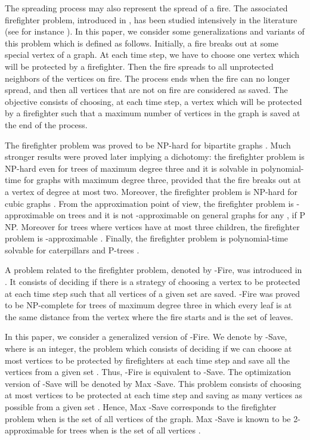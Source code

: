 \documentclass[10pt]{article}
\begin{document}
The spreading process may also represent the spread of a fire. The associated firefighter problem, introduced in \cite{hartnell1995}, 
has been studied intensively in the literature (see for instance \cite{anshelevich2009,cai2008,develin2007,finbow2007,finbow2009,hartnell1995,hartnell2000,IKM11,king2010,macgillivray2003,ng2008}). In this paper, 
we consider some generalizations and variants of this problem which is defined as follows.
Initially, a fire breaks out at some special
vertex  of a graph. At each time step, we have to choose one
vertex which will be protected by a firefighter. Then the fire
spreads to all unprotected neighbors of the vertices on fire. The
process ends when the fire can no longer spread, and then all
vertices that are not on fire are considered as saved. The
objective consists of choosing, at each time step, a vertex which
will be protected by a firefighter such that a maximum number of
vertices in the graph is saved at the end of the process. 

The firefighter problem
was proved to be NP-hard for bipartite graphs
\cite{macgillivray2003}. Much stronger results were proved later
\cite{finbow2007} implying a dichotomy: the firefighter problem is
NP-hard even for trees of maximum degree three and it is solvable
in polynomial-time for graphs with maximum degree three, provided
that the fire breaks out at a vertex of degree at most two.
Moreover, the firefighter problem is NP-hard for cubic graphs
\cite{king2010}. From the approximation point of view, the
firefighter problem is -approximable on trees \cite{cai2008} and
it is not -approximable on general graphs for any 
\cite{anshelevich2009}, if P NP. Moreover for trees where vertices have at most three children, 
the firefighter problem is -approximable \cite{IKM11}. Finally, the firefighter problem is polynomial-time solvable for caterpillars and P-trees \cite{macgillivray2003}.

A problem related to the firefighter
problem, denoted by {\sc -Fire}, was introduced in
\cite{king2010}. It consists of deciding if there is a strategy
of choosing a vertex to be protected at each time step such that  all vertices
of a given set  are saved. {\sc -Fire} was proved to be
NP-complete for trees of maximum degree three in which every leaf is
at the same distance from the vertex where the fire starts and  is the set of leaves.

In this paper, we consider a generalized version of {\sc
-Fire}. We denote by {\sc -Save}, where  is an integer,
the problem which consists of deciding if we can choose at most  vertices
to be protected by firefighters at each time step and save all the vertices
from a given set . Thus, {\sc -Fire} is equivalent to {\sc -Save}.
The optimization version of {\sc -Save} will be denoted by {\sc Max -Save}.
This problem consists of choosing at most  vertices to be protected at each time
step and saving as many vertices as possible from a given set . Hence, {\sc Max -Save}
corresponds to the firefighter problem when  is the set of all vertices of the graph.
{\sc Max -Save} is known to be 2-approximable for trees  when  is the
set of all vertices \cite{hartnell2000}. 
\end{document}
